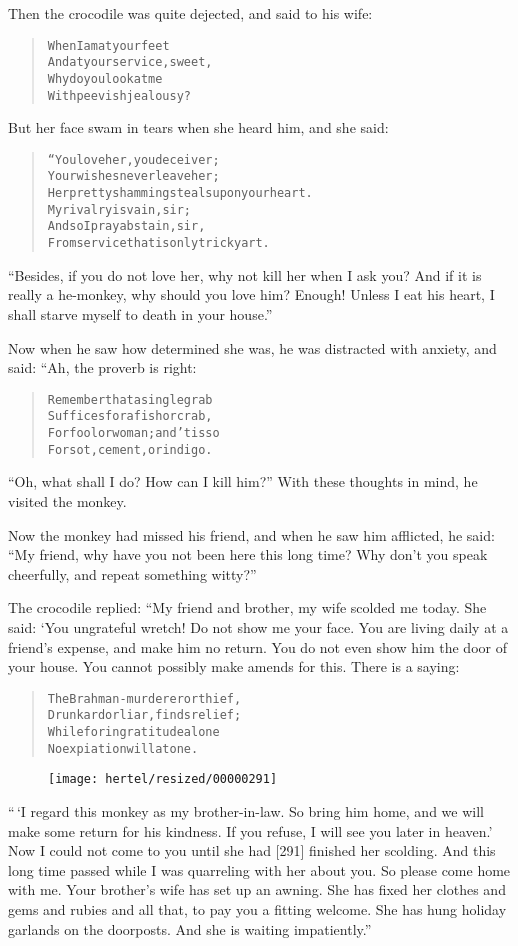 \documentclass[article, twoside, 10pt]{memoir}
\renewenvironment{verbatim}{%
\begin{quote}%
\vskip -10pt%
\begin{alltt}\normalfont\small}{\end{alltt}%
\end{quote}%
\vskip -10pt
} %
\begin{document}
Then the crocodile was quite dejected, and said to his wife:

\begin{verbatim}
When I am at your feet
And at your service, sweet,
Why do you look at me
With peevish jealousy?
\end{verbatim}
But her face swam in tears when she heard him, and she said:

\begin{verbatim}
“You love her, you deceiver;
Your wishes never leave her;
Her pretty shamming steals upon your heart.
    My rivalry is vain, sir;
    And so I pray abstain, sir,
From service that is only tricky art.
\end{verbatim}
``Besides, if you do not love her, why not kill her when I ask you? And if it is really a he-monkey, why should you love him? Enough! Unless I eat his heart, I shall starve myself to death in your house.''

Now when he saw how determined she was, he was distracted with
anxiety, and said: “Ah, the proverb is right:

\begin{verbatim}
Remember that a single grab
Suffices for a fish or crab,
For fool or woman; and 'tis so
For sot, cement, or indigo.
\end{verbatim}
``Oh, what shall I do? How can I kill him?'' With these thoughts in
mind, he visited the monkey.

Now the monkey had missed his friend, and when he saw him
afflicted, he said:
``My friend, why have you not been here this long time? Why don't you speak cheerfully, and repeat something witty?''

The crocodile replied: “My friend and brother, my wife scolded me
today. She said: ‘You ungrateful wretch! Do not show me your face.
You are living daily at a friend's expense, and make him no return.
You do not even show him the door of your house. You cannot
possibly make amends for this. There is a saying:

\begin{verbatim}
The Brahman-murderer or thief,
Drunkard or liar, finds relief;
While for ingratitude alone
No expiation will atone.
\end{verbatim}
\begin{figure}[p]\texttt{[image: hertel/resized/00000291]}\end{figure}``\,`I regard this monkey as my brother-in-law. So bring him home, and we will make some return for his kindness. If you refuse, I will see you later in heaven.' Now I could not come to you until she had [291] finished her scolding. And this long time passed while I was quarreling with her about you. So please come home with me. Your brother's wife has set up an awning. She has fixed her clothes and gems and rubies and all that, to pay you a fitting welcome. She has hung holiday garlands on the doorposts. And she is waiting impatiently.''
\end{document}
